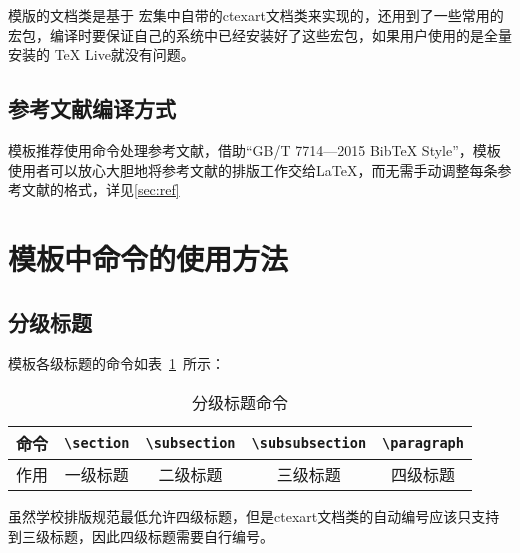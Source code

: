 模版的文档类是基于\CTeX{} 宏集中自带的ctexart文档类来实现的\cite{x5}，还用到了一些常用的宏包，编译时要保证自己的系统中已经安装好了这些宏包，如果用户使用的是全量安装的 TeX Live就没有问题。

\subsection{参考文献编译方式}

模板推荐使用\verb||命令处理参考文献，借助“GB/T 7714—2015 BibTeX Style”\cite{x6}，模板使用者可以放心大胆地将参考文献的排版工作交给\LaTeX ，而无需手动调整每条参考文献的格式，详见\ref{sec:ref}

\section{模板中命令的使用方法}

\subsection{分级标题}

模板各级标题的命令如表~\ref{table_title_command}~所示：

\begin{table}[htbp!]
    \centering
    \caption{分级标题命令}
    \label{table_title_command}
    \begin{tabular}{ccccc}
        \toprule
        命令 & \verb|\section| & \verb|\subsection| & \verb|\subsubsection| & \verb|\paragraph| \\
        \midrule
        作用 & 一级标题        & 二级标题           & 三级标题              & 四级标题          \\
        \bottomrule
    \end{tabular}
\end{table}

虽然学校排版规范最低允许四级标题，但是ctexart文档类的自动编号应该只支持到三级标题，因此四级标题需要自行编号。


